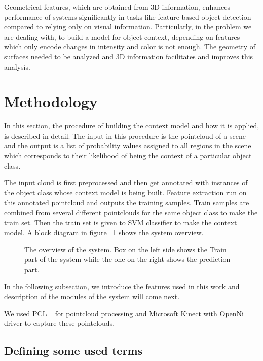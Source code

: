 Geometrical features, which are obtained from 3D information, enhances performance of systems significantly in tasks like feature 
based object detection compared to relying only on visual information. 
Particularly, in the problem we are dealing with, to build a model for object context, depending on features which only encode 
changes in intensity and color is not enough. The geometry of surfaces needed to be analyzed and 3D information facilitates and improves this analysis.


\section{Methodology}
\label{Implementation.sec}

In this section, the procedure of building the context model and how it is applied, is described in detail. 
The input in this procedure is the pointcloud of a scene and the output is a list of probability values assigned to all regions in
the scene which corresponds to their likelihood of being the context of a particular object class. 


The input cloud is first preprocessed and then get annotated with instances of the object class whose context model is being built. 
Feature extraction run on this annotated pointcloud and outputs the training samples. Train samples are combined from several different pointclouds for the same object class to make the train set. 
Then the train set is given to SVM classifier to make the context model. A block diagram in figure ~\ref{SystemOverview.figure} shows 
the system overview.

\begin{figure}[t]
  \caption[System Overview]
  {The overview of the system. Box on the left side shows the Train part of the system while the one on the right shows the prediction part.}
  \label{SystemOverview.figure}
\end{figure}

In the following subsection, we introduce the features used in this work and description of the modules of the system 
will come next.

We used PCL ~\cite{Rusu_ICRA2011_PCL} for pointcloud processing and Microsoft Kinect with OpenNi driver to capture these pointclouds.

\subsection{Defining some used terms}

